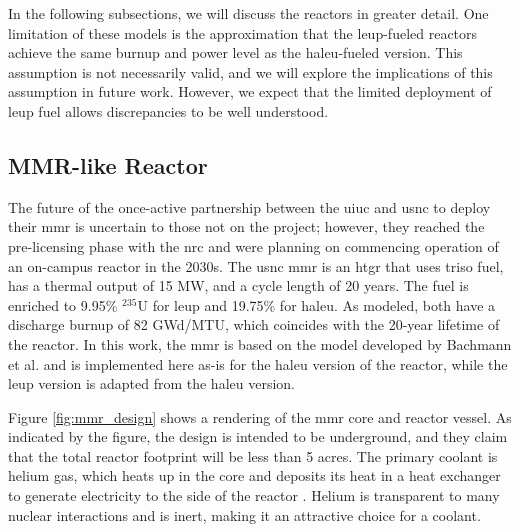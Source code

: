 In the following subsections, we will discuss the reactors in greater detail. One limitation of these models is the approximation that the \gls{leup}-fueled reactors achieve the same burnup and power level as the \gls{haleu}-fueled version. This assumption is not necessarily valid, and we will explore the implications of this assumption in future work. However, we expect that the limited deployment of \gls{leup} fuel allows discrepancies to be well understood.

\subsection{MMR-like Reactor}
\label{sec:mmr}

The future of the once-active partnership between the \gls{uiuc} and \gls{usnc} to deploy their \gls{mmr} is uncertain to those not on the project; however, they reached the pre-licensing phase with the \gls{nrc} and were planning on commencing operation of an on-campus reactor in the 2030s. The \gls{usnc} \gls{mmr} is an \gls{htgr} that uses \gls{triso} fuel, has a thermal output of 15 MW, and a cycle length of 20 years. The fuel is enriched to 9.95\% $^{235}$U for \gls{leup} and 19.75\% for \gls{haleu}. As modeled, both have a discharge burnup of 82 GWd/MTU, which coincides with the 20-year lifetime of the reactor. In this work, the \gls{mmr} is based on the model developed by Bachmann et al. \cite{bachmann_mmr_like_2023} and is implemented here as-is for the \gls{haleu} version of the reactor, while the \gls{leup} version is adapted from the \gls{haleu} version.

Figure \ref{fig:mmr_design} shows a rendering of the \gls{mmr} core and reactor vessel. As indicated by the figure, the design is intended to be underground, and they claim that the total reactor footprint will be less than 5 acres. The primary coolant is helium gas, which heats up in the core and deposits its heat in a heat exchanger to generate electricity to the side of the reactor \cite{usnc_chalk_river}. Helium is transparent to many nuclear interactions and is inert, making it an attractive choice for a coolant.

